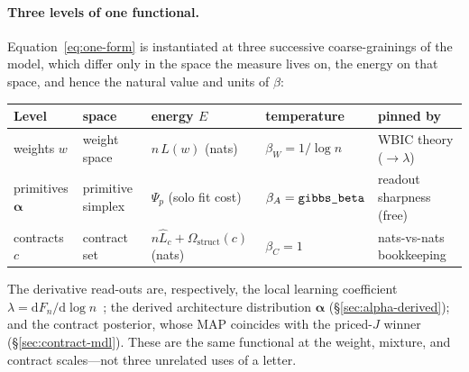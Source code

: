 \documentclass[11pt]{article}
\newcommand{\allowbreakhere}{\discretionary{}{}{}}
\newcommand{\code}[1]{\texttt{\def\_{\char`_\allowbreakhere}#1}}
\newcommand{\alphapar}{\bm{\alpha}}
\begin{document}
\paragraph{Three levels of one functional.} Equation~\eqref{eq:one-form} is instantiated at three successive coarse-grainings of the model, which differ only in the space the measure lives on, the energy on that space, and hence the natural value and units of $\beta$:
\begin{center}
\small
\renewcommand{\arraystretch}{1.25}
\begin{tabular}{p{1.5cm} p{2.6cm} p{3.3cm} p{2.5cm} p{2.6cm}}
\toprule
\textbf{Level} & \textbf{space} & \textbf{energy $E$} & \textbf{temperature} & \textbf{pinned by}\\
\midrule
weights $w$ & weight space & $n\,L(w)$ (nats) & $\beta_W=1/\log n$ & WBIC theory ($\to\lambda$)\\
primitives $\alphapar$ & primitive simplex & $\Psi_p$ (solo fit cost) & $\beta_A=\code{gibbs\_beta}$ & readout sharpness (free)\\
contracts $c$ & contract set & $n\hat L_c+\Omega_{\mathrm{struct}}(c)$ (nats) & $\beta_C=1$ & nats-vs-nats bookkeeping\\
\bottomrule
\end{tabular}
\end{center}
The derivative read-outs are, respectively, the local learning coefficient $\lambda=\mathrm{d}F_n/\mathrm{d}\log n$~\cite{lau2023llc}; the derived architecture distribution $\alphapar$ (\S\ref{sec:alpha-derived}); and the contract posterior, whose MAP coincides with the priced-$J$ winner (\S\ref{sec:contract-mdl}). These are the same functional at the weight, mixture, and contract scales---not three unrelated uses of a letter.
\end{document}

